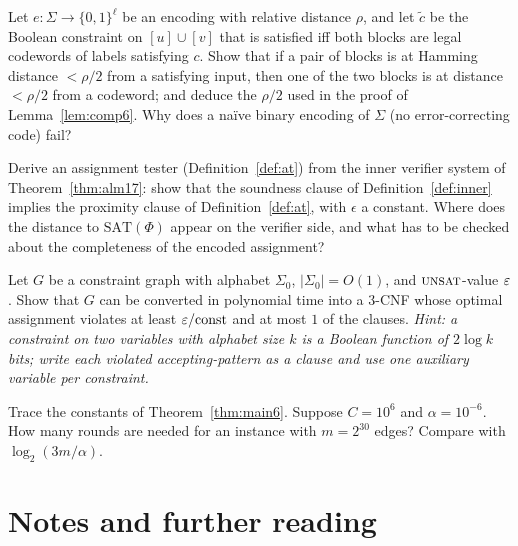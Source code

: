 \begin{exercise}[\stars{$\star\star$}]\label{ex:robustization}
Let $e\colon\Sigma\to\{0,1\}^\ell$ be an encoding with relative distance $\rho$, and let $\tilde c$ be the Boolean constraint on $[u]\cup[v]$ that is satisfied iff both blocks are legal codewords of labels satisfying $c$.  Show that if a pair of blocks is at Hamming distance $<\rho/2$ from a satisfying input, then one of the two blocks is at distance $<\rho/2$ from a codeword; and deduce the $\rho/2$ used in the proof of Lemma~\ref{lem:comp6}.
Why does a na\"ive binary encoding of $\Sigma$ (no error-correcting code) fail?
\end{exercise}

\begin{exercise}[\stars{$\star\star\star$}]\label{ex:at-from-pcp}
Derive an assignment tester (Definition~\ref{def:at}) from the inner verifier system of Theorem~\ref{thm:alm17}: show that the soundness clause of Definition~\ref{def:inner} implies the proximity clause of Definition~\ref{def:at}, with $\epsilon$ a constant.  Where does the distance to $\mathrm{SAT}(\Phi)$ appear on the verifier side, and what has to be checked about the completeness of the encoded assignment?
\end{exercise}

\begin{exercise}[\stars{$\star$}]\label{ex:gap3sat}
Let $G$ be a constraint graph with alphabet $\Sigma_0$, $|\Sigma_0|=O(1)$, and $\textsc{unsat}$-value $\varepsilon$.  Show that $G$ can be converted in polynomial time into a $3$-CNF whose optimal assignment violates at least $\varepsilon/\mathrm{const}$ and at most $1$ of the clauses.  \emph{Hint: a constraint on two variables with alphabet size $k$ is a Boolean function of $2\log k$ bits; write each violated accepting-pattern as a clause and use one auxiliary variable per constraint.}
\end{exercise}

\begin{exercise}[\stars{$\star\star$}]\label{ex:iter-check}
Trace the constants of Theorem~\ref{thm:main6}.  Suppose $C=10^{6}$ and $\alpha=10^{-6}$.  How many rounds are needed for an instance with $m=2^{30}$ edges?  Compare with $\log_2(3m/\alpha)$.
\end{exercise}


\section*{Notes and further reading}

